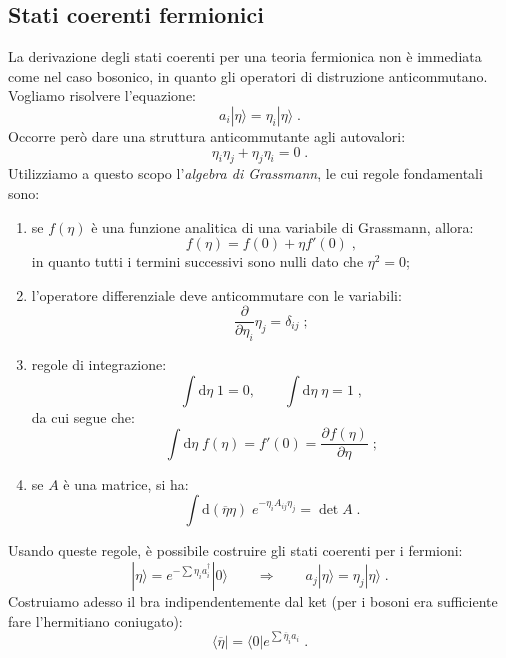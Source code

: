 \documentclass[12pt,a4paper]{article}
\theoremstyle{definition}
\newcommand{\pdev}[3][]{\frac{\partial^{#1} #2}{\partial #3^{#1}}}
\numberwithin{equation}{section}
\newcommand{\diff}[1][]{\mathrm{d}#1}
\newcommand{\bra}{\langle}
\newcommand{\ket}{\rangle}
\newcommand{\adj}[1]{#1^{\dagger}}
\begin{document}
\subsection{Stati coerenti fermionici}
La derivazione degli stati coerenti per una teoria fermionica non è immediata come nel caso bosonico, in quanto gli operatori di distruzione anticommutano. Vogliamo risolvere l'equazione:
$$
a_i|\eta\ket=\eta_i|\eta\ket\;.
$$
Occorre però dare una struttura anticommutante agli autovalori:
\begin{equation}
\eta_i\eta_j+\eta_j\eta_i=0\;.
\end{equation}
Utilizziamo a questo scopo l'\emph{algebra di Grassmann}, le cui regole fondamentali sono:
\begin{enumerate}
\item se $f(\eta)$ è una funzione analitica di una variabile di Grassmann, allora:
\begin{equation}
f(\eta)=f(0)+\eta f'(0)\;,
\end{equation}
in quanto tutti i termini successivi sono nulli dato che $\eta^2=0$;
\item l'operatore differenziale deve anticommutare con le variabili:
\begin{equation}
\frac{\partial}{\partial \eta_i}\eta_j=\delta_{ij}\;;
\end{equation}
\item regole di integrazione:
\begin{equation}
\int\diff{\eta}\;1=0,\qquad \int\diff{\eta}\;\eta=1\;,
\end{equation}
da cui segue che:
\begin{equation}
\int\diff{\eta}\;f(\eta)=f'(0)=\pdev{f(\eta)}{\eta}\;;
\end{equation}
\item se $A$ è una matrice, si ha:
\begin{equation}
\int\diff{(\overline{\eta}\eta)}\;e^{-\eta_iA_{ij}\eta_j}=\det A\;.
\end{equation}
\end{enumerate}
Usando queste regole, è possibile costruire gli stati coerenti per i fermioni:
\begin{equation}
|\eta\ket=e^{-\sum\eta_i\adj{a}_i}|0\ket\qquad \Longrightarrow \qquad a_j|\eta\ket=\eta_j|\eta\ket\;.
\end{equation}
Costruiamo adesso il bra indipendentemente dal ket (per i bosoni era sufficiente fare l'hermitiano coniugato):
\begin{equation}
\bra\overline{\eta}|=\bra 0|e^{\sum \overline{\eta}_ia_i}\;.
\end{equation}
\end{document}
